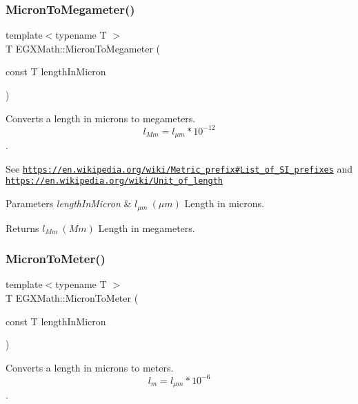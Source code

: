 \subsubsection{\texorpdfstring{Micron\+To\+Megameter()}{MicronToMegameter()}}
{\footnotesize\ttfamily template$<$typename T $>$ \\
T E\+G\+X\+Math\+::\+Micron\+To\+Megameter (\begin{DoxyParamCaption}\item[{const T}]{length\+In\+Micron }\end{DoxyParamCaption})}



Converts a length in microns to megameters. \[ l_{Mm}=l_{\mu m} * 10^{-12} \]. 

See \href{https://en.wikipedia.org/wiki/Metric_prefix#List_of_SI_prefixes}{\tt https\+://en.\+wikipedia.\+org/wiki/\+Metric\+\_\+prefix\#\+List\+\_\+of\+\_\+\+S\+I\+\_\+prefixes} and \href{https://en.wikipedia.org/wiki/Unit_of_length}{\tt https\+://en.\+wikipedia.\+org/wiki/\+Unit\+\_\+of\+\_\+length} 
\begin{DoxyParams}{Parameters}
{\em length\+In\+Micron} & $ l_{\mu m}\ (\mu m)$ Length in microns. \\
\hline
\end{DoxyParams}
\begin{DoxyReturn}{Returns}
$ l_{Mm}\ (Mm)$ Length in megameters. 
\end{DoxyReturn}
\mbox{\label{group___e_g_x_math-_conversions-_length_conversions-_non-_s_i-_micron-_s_i_gacbe71c60e4b4c0c2aebab6dbbe4b35c0}} 
\subsubsection{\texorpdfstring{Micron\+To\+Meter()}{MicronToMeter()}}
{\footnotesize\ttfamily template$<$typename T $>$ \\
T E\+G\+X\+Math\+::\+Micron\+To\+Meter (\begin{DoxyParamCaption}\item[{const T}]{length\+In\+Micron }\end{DoxyParamCaption})}



Converts a length in microns to meters. \[ l_{m}=l_{\mu m} * 10^{-6} \]. 


